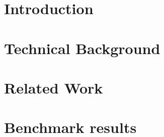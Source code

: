 



\frenchspacing
\raggedbottom
{} %
\pagestyle{plain}
%


\cleardoublepage
\cleardoublepage
\pagestyle{scrheadings}
\cleardoublepage
\cleardoublepage
\chapter{Introduction}
 
\cleardoublepage

\chapter{Technical Background}

\chapter{Related Work}

\chapter{Benchmark results}

